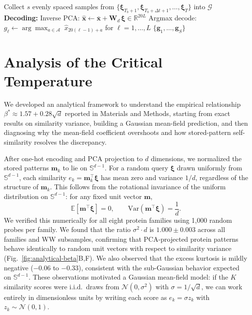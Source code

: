 \begin{algorithm}[ht]
\begin{algorithmic}[1]
    \ENDFOR
    \STATE Collect $s$ evenly spaced samples from $\{\boldsymbol{\xi}_{T_b+1}, \boldsymbol{\xi}_{T_b+\Delta t+1}, \ldots, \boldsymbol{\xi}_T\}$ into $\mathcal{G}$
\ENDFOR
\STATE \textbf{Decoding:}
    \STATE Inverse PCA: $\hat{\mathbf{x}} \leftarrow \bar{\mathbf{x}} + \mathbf{W}_d\,\boldsymbol{\xi} \in \mathbb{R}^{20L}$
    \STATE Argmax decode: $g_\ell \leftarrow \arg\max_{a \in \mathcal{A}}\; \hat{x}_{20(\ell-1)+a}$ \; for $\ell = 1,\ldots,L$
\ENDFOR
\RETURN $\{\mathbf{g}_1, \ldots, \mathbf{g}_S\}$
\end{algorithmic}
\end{algorithm}

\section{Analysis of the Critical Temperature}\label{app:beta-star-analysis}

We developed an analytical framework to understand the empirical relationship $\beta^* \approx 1.57 + 0.28\sqrt{d}$ reported in Materials and Methods, starting from exact results on similarity variance, building a Gaussian mean-field prediction, and then diagnosing why the mean-field coefficient overshoots and how stored-pattern self-similarity resolves the discrepancy.

\label{app:concentration}
After one-hot encoding and PCA projection to $d$ dimensions, we normalized the stored patterns $\mathbf{m}_k$ to lie on $\mathbb{S}^{d-1}$. For a random query $\boldsymbol{\xi}$ drawn uniformly from $\mathbb{S}^{d-1}$, each similarity $e_k = \mathbf{m}_k^\top\boldsymbol{\xi}$ has mean zero and variance $1/d$, regardless of the structure of $\mathbf{m}_k$. This follows from the rotational invariance of the uniform distribution on $\mathbb{S}^{d-1}$: for any fixed unit vector $\mathbf{m}$,
\begin{equation}
    \mathbb{E}[\mathbf{m}^\top\boldsymbol{\xi}] = 0, \qquad \mathrm{Var}(\mathbf{m}^\top\boldsymbol{\xi}) = \frac{1}{d}.
\end{equation}
We verified this numerically for all eight protein families using 1{,}000 random probes per family. We found that the ratio $\sigma^2 \cdot d$ is $1.000 \pm 0.003$ across all families and WW subsamples, confirming that PCA-projected protein patterns behave identically to random unit vectors with respect to similarity variance (Fig.~\ref{fig:analytical-beta}B,F). We also observed that the excess kurtosis is mildly negative ($-0.06$ to $-0.33$), consistent with the sub-Gaussian behavior expected on $\mathbb{S}^{d-1}$. These observations motivated a Gaussian mean-field model: if the $K$ similarity scores were i.i.d.\ draws from $\mathcal{N}(0, \sigma^2)$ with $\sigma = 1/\sqrt{d}$, we can work entirely in dimensionless units by writing each score as $e_k = \sigma z_k$ with $z_k \sim \mathcal{N}(0,1)$.

